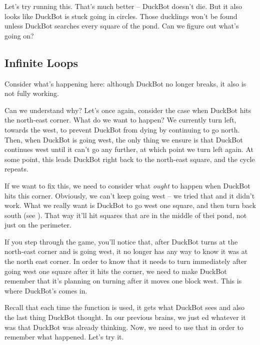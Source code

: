 Let's try running this. That's much better -- DuckBot doesn't die. But it also looks like DuckBot is
stuck going in circles. Those ducklings won't be found unless DuckBot searches every square of the
pond. Can we figure out what's going on?

\subsection{Infinite Loops}

Consider what's happening here: although DuckBot no longer breaks, it also is not fully
working. 

Can we understand why? Let's once again, consider the case when DuckBot hits the north-east
corner. What do we want to happen? We currently turn left, towards the west, to prevent DuckBot from
dying by continuing to go north. Then, when DuckBot is going west, the only thing we ensure is that
DuckBot continues west until it can't go any further, at which point we turn left again. At some
point, this leads DuckBot right back to the north-east square, and the cycle repeats.

If we want to fix this, we need to consider what \emph{ought} to happen when DuckBot hits this
corner. Obviously, we can't keep going west -- we tried that and it didn't work. What we really want
is DuckBot to go west one square, and then turn back south (see
). That way it'll hit squares that are in the middle of thei
pond, not just on the perimeter.

If you step through the game, you'll notice that, after DuckBot turns at the north-east corner and
is going west, it no longer has any way to know it was at the north east corner. In order to know
that it needs to turn immediately after going west one square after it hits the corner, we need to
make DuckBot remember that it's planning on turning after it moves one block west. This is where
DuckBot's  comes in.

Recall that each time the  function is used, it gets what DuckBot sees and also the last
thing DuckBot thought. In our previous brains, we just ed whatever it was that DuckBot
was already thinking. Now, we need to use that  in order to remember what
happened. Let's try it.

